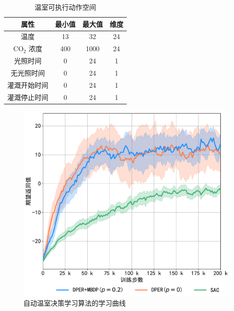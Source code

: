 \begin{table}[htbp]
\centering
\caption{温室可执行动作空间}
\begin{tabular}{cccc}
\toprule
\textbf{属性}                                     & \textbf{最小值} & \textbf{最大值} & \textbf{维度} \\
\midrule
温度          & 13           & 32           & 24           \\
CO$_2$ 浓度               & 400          & 1000         & 24           \\
光照时间                 & 0            & 24           & 1            \\
无光照时间                & 0            & 24           & 1            \\
灌溉开始时间         & 0            & 24           & 1            \\
灌溉停止时间          & 0            & 24           & 1            \\
\bottomrule
\end{tabular}
\label{tab:act-space}
\end{table}

\begin{figure}[t]
\centering
\includegraphics[width=\textwidth]{figures/acml-train.pdf}
\caption{自动温室决策学习算法的学习曲线}
\label{fig:acml-train}
\end{figure}

